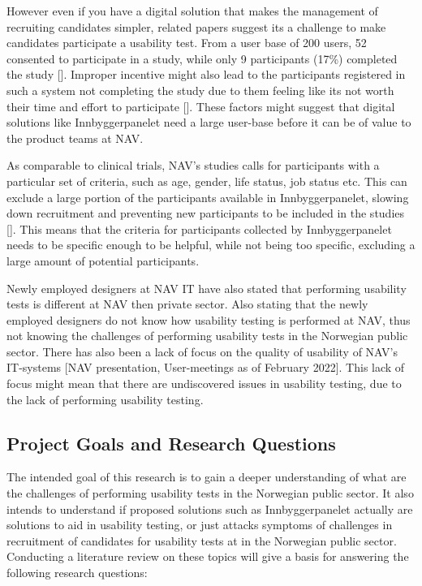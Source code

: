 However even if you have a digital solution that makes the management of recruiting candidates simpler, related papers suggest its a challenge to make candidates participate a usability test. From a user base of 200 users, 52 consented to participate in a study, while only 9 participants (17\%) completed the study [\cite{pkf_2018}]. Improper incentive might also lead to the participants registered in such a system not completing the study due to them feeling like its not worth their time and effort to participate [\cite{pkf_2018}]. These factors might suggest that digital solutions like Innbyggerpanelet need a large user-base before it can be of value to the product teams at NAV.

As comparable to clinical trials, NAV's studies calls for participants with a particular set of criteria, such as age, gender, life status, job status etc. This can exclude a large portion of the participants available in Innbyggerpanelet, slowing down recruitment and preventing new participants to be included in the studies [\cite{nc_2020}]. This means that the criteria for participants collected by Innbyggerpanelet needs to be specific enough to be helpful, while not being too specific, excluding a large amount of potential participants.

Newly employed designers at NAV IT have also stated that performing usability tests is different at NAV then private sector. Also stating that the newly employed designers do not know how usability testing is performed at NAV, thus not knowing the challenges of performing usability tests in the Norwegian public sector. There has also been a lack of focus on the quality of usability of NAV's IT-systems [NAV presentation, User-meetings as of February 2022]. This lack of focus might mean that there are undiscovered issues in usability testing, due to the lack of performing usability testing.

\subsection{Project Goals and Research Questions}
The intended goal of this research is to gain a deeper understanding of what are the challenges of performing usability tests in the Norwegian public sector. It also intends to understand if proposed solutions such as Innbyggerpanelet actually are solutions to aid in usability testing, or just attacks symptoms of challenges in recruitment of candidates for usability tests at in the Norwegian public sector. Conducting a literature review on these topics will give a basis for answering the following research questions: 

